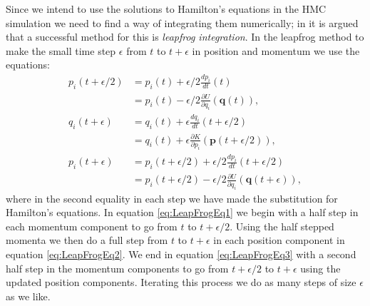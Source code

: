 \documentclass[12pt]{article}
\begin{document}
            Since we intend to use the solutions to Hamilton's equations in the HMC simulation we need to find a way of integrating them numerically; in \cite{neal_2011} it is argued that a successful method for this is \textit{leapfrog integration}. In the leapfrog method to make the small time step $\epsilon$ from $t$ to $t+\epsilon$ in position and momentum we use the equations:
            \begin{align}
                \label{eq:LeapFrogEq1} p_i\left(t+\epsilon/2\right) & = p_i\left(t\right) + \epsilon/2\frac{dp_i}{dt}\left(t\right)\\ 
                 & = p_i\left(t\right) - \epsilon/2\frac{\partial U}{\partial q_i}\left(\bm{q}\left(t\right)\right), \\
                \label{eq:LeapFrogEq2}q_i\left(t+\epsilon\right) & = q_i\left(t\right) + \epsilon\frac{dq_i}{dt}\left(t+\epsilon/2\right) \\
                &  = q_i\left(t\right) + \epsilon\frac{\partial K}{\partial p_i}\left(\bm{p}\left(t+\epsilon/2\right)\right), \\
                \label{eq:LeapFrogEq3}p_i\left(t+\epsilon\right) & = p_i\left(t+\epsilon/2\right) + \epsilon/2\frac{dp_i}{dt}\left(t+\epsilon/2\right) \\
                & = p_i\left(t+\epsilon/2\right) - \epsilon/2\frac{\partial U}{\partial q_i}\left(\bm{q}\left(t+\epsilon\right)\right),
            \end{align}
            where in the second equality in each step we have made the substitution for Hamilton's equations.
            In equation \ref{eq:LeapFrogEq1} we begin with a half step in each momentum component to go from $t$ to $t+\epsilon/2$. Using the half stepped momenta we then do a full step from $t$ to $t+\epsilon$ in each position component in equation \ref{eq:LeapFrogEq2}. We end in equation \ref{eq:LeapFrogEq3} with a second half step in the momentum components to go from $t+\epsilon/2$ to $t+\epsilon$ using the updated position components. Iterating this process we do as many steps of size $\epsilon$ as we like.
\end{document}
